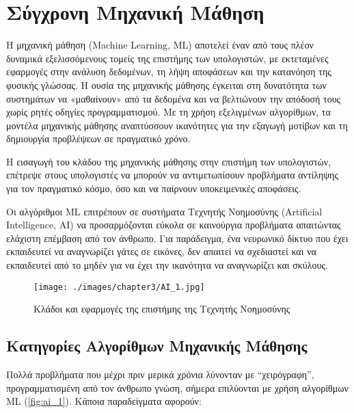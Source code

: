 \newpage
\section{Σύγχρονη Μηχανική Μάθηση}
\label{sec:theory_ml}

Η μηχανική μάθηση (Machine Learning, ML) αποτελεί έναν από τους πλέον δυναμικά εξελισσόμενους τομείς της επιστήμης των υπολογιστών, με εκτεταμένες εφαρμογές στην ανάλυση δεδομένων, τη λήψη αποφάσεων και την κατανόηση της φυσικής γλώσσας. Η ουσία της μηχανικής μάθησης έγκειται στη δυνατότητα των συστημάτων να «μαθαίνουν» από τα δεδομένα και να βελτιώνουν την απόδοσή τους χωρίς ρητές οδηγίες προγραμματισμού. Με τη χρήση εξελιγμένων αλγορίθμων, τα μοντέλα μηχανικής μάθησης αναπτύσσουν ικανότητες για την εξαγωγή μοτίβων και τη δημιουργία προβλέψεων σε πραγματικό χρόνο.

Η εισαγωγή του κλάδου της μηχανικής μάθησης στην επιστήμη των υπολογιστών,
επέτρεψε στους υπολογιστές να μπορούν να αντιμετωπίσουν προβλήματα αντίληψης
για τον πραγματικό κόσμο, όσο και να παίρνουν υποκειμενικές αποφάσεις.

Οι αλγόριθμοι ML επιτρέπουν σε συστήματα Τεχνητής Νοημοσύνης (Artificial Intelligence, AI)
να προσαρμόζονται εύκολα σε καινούργια προβλήματα απαιτώντας ελάχιστη επέμβαση από τον άνθρωπο.
Για παράδειγμα, ένα νευρωνικό δίκτυο που έχει εκπαιδευτεί να αναγνωρίζει γάτες σε εικόνες,
δεν απαιτεί να σχεδιαστεί και να εκπαιδευτεί από το μηδέν για να έχει την ικανότητα
να αναγνωρίζει και σκύλους.

\begin{figure}[!ht]
  \centering
  \texttt{[image: ./images/chapter3/AI\_1.jpg]}
  \caption[Κλάδοι και εφαρμογές της επιστήμης της Τεχνητής Νοημοσύνης]{Κλάδοι και εφαρμογές της επιστήμης της Τεχνητής Νοημοσύνης}
  \label{fig:ai_1}
\end{figure}

\subsection{Κατηγορίες Αλγορίθμων Μηχανικής Μάθησης}
Πολλά προβλήματα που μέχρι πριν μερικά χρόνια λύνονταν με
“χειρόγραφη”, προγραμματισμένη από τον άνθρωπο γνώση, σήμερα επιλύονται με χρήση
αλγορίθμων ML (\autoref{fig:ai_1}). Κάποια παραδείγματα αφορούν:


